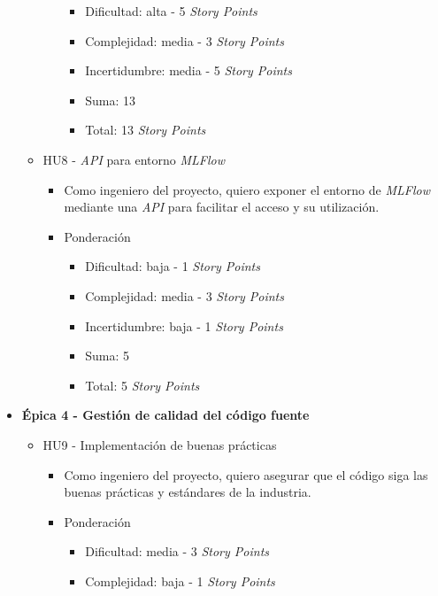 \documentclass[
11pt, %
]{charter}
\begin{document}
\begin{itemize}
\begin{itemize}
\begin{itemize}
\begin{itemize}
                \item Dificultad: alta - 5 \textit{Story Points}
                \item Complejidad: media - 3 \textit{Story Points}
                \item Incertidumbre: media - 5 \textit{Story Points}
                \item Suma: 13
                \item Total: 13 \textit{Story Points}
            \end{itemize}
        \end{itemize}
      \item HU8 - \textit{API} para entorno \textit{MLFlow}
        \begin{itemize}
            \item Como ingeniero del proyecto, quiero exponer el entorno de \textit{MLFlow} mediante una \textit{API} para facilitar el acceso y su utilización.
            \item Ponderación
            \begin{itemize}
                \item Dificultad: baja - 1 \textit{Story Points}
                \item Complejidad: media - 3 \textit{Story Points}
                \item Incertidumbre: baja - 1 \textit{Story Points}
                \item Suma: 5
                \item Total: 5 \textit{Story Points}
            \end{itemize}
        \end{itemize}
    \end{itemize}
  \item \textbf{\'{E}pica 4 - Gestión de calidad del código fuente}
    \begin{itemize}
      \item HU9 - Implementación de buenas prácticas
        \begin{itemize}
            \item Como ingeniero del proyecto, quiero asegurar que el código siga las buenas prácticas y estándares de la industria.
            \item Ponderación
            \begin{itemize}
                \item Dificultad: media - 3 \textit{Story Points}
                \item Complejidad: baja - 1 \textit{Story Points}

\end{itemize}
\end{itemize}
\end{itemize}
\end{itemize}
\end{document}
